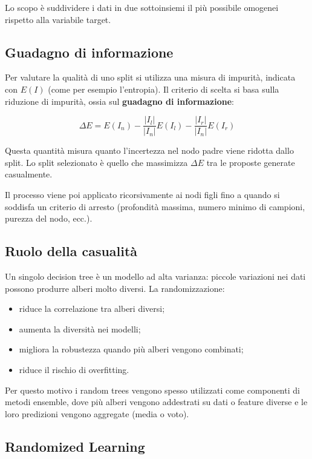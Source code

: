 Lo scopo è suddividere i dati in due sottoinsiemi il più possibile omogenei rispetto alla variabile target.

\subsection{Guadagno di informazione}

Per valutare la qualità di uno split si utilizza una misura di impurità, indicata con $E(I)$ (come per esempio l'entropia). Il criterio di scelta si basa sulla riduzione di impurità, ossia sul \textbf{guadagno di informazione}:

\[
\Delta E
=
E(I_n)
-
\frac{|I_l|}{|I_n|} E(I_l)
-
\frac{|I_r|}{|I_n|} E(I_r)
\]

Questa quantità misura quanto l’incertezza nel nodo padre viene ridotta dallo split. Lo split selezionato è quello che massimizza $\Delta E$ tra le proposte generate casualmente.

Il processo viene poi applicato ricorsivamente ai nodi figli fino a quando si soddisfa un criterio di arresto (profondità massima, numero minimo di campioni, purezza del nodo, ecc.).

\subsection{Ruolo della casualità}
Un singolo decision tree è un modello ad alta varianza: piccole variazioni nei dati possono produrre alberi molto diversi. La randomizzazione:

\begin{itemize}
    \item riduce la correlazione tra alberi diversi;
    \item aumenta la diversità nei modelli;
    \item migliora la robustezza quando più alberi vengono combinati;
    \item riduce il rischio di overfitting.
\end{itemize}

Per questo motivo i random trees vengono spesso utilizzati come componenti di metodi ensemble, dove più alberi vengono addestrati su dati o feature diverse e le loro predizioni vengono aggregate (media o voto).

\subsection{Randomized Learning}

